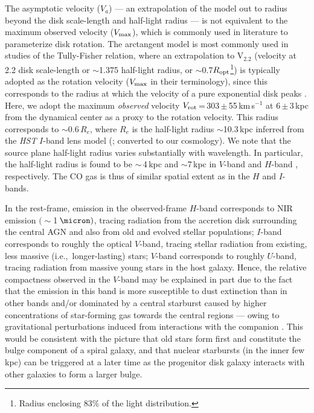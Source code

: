 \documentclass[]{emulateapj}
\newcommand{\kms}{\mbox{km\,s$^{-1}$}\xspace}
\newcommand{\eg}{{e.g.,~}}
\newcommand{\ie}{{i.e.,~}}
\begin{document}
The asymptotic velocity ($V_{a}$) --- an extrapolation of the model
out to radius beyond the disk scale-length and half-light radius ---
is not equivalent to the maximum observed velocity ($V_{\rm max}$),
which is commonly used in literature to parameterize disk rotation.
The arctangent model is most commonly used in studies of the
Tully-Fisher relation, where an extrapolation to V$_{2.2}$ (velocity
at 2.2 disk scale-length or $\sim$1.375 half-light radius,
or $\sim$0.7$R_{\rm opt}$\footnote{Radius enclosing 83\% of the light
distribution.}) is typically adopted
as the rotation velocity ($V_{\rm max}$ in their
terminology), since this corresponds to the radius at which the velocity
of a pure exponential disk peaks \citep{Courteau97b}.
Here, we adopt the maximum {\em observed} velocity
$V_{\rm rot}$\,=\,303\,$\pm$\,55\,\kms at 6\,$\pm$\,3\,kpc
from the
dynamical center as a proxy to the rotation velocity.
This radius corresponds to $\sim$0.6\,$R_e$, where $R_e$ is the half-light
radius $\sim$10.3\,kpc inferred from the {\it HST} $I$-band
lens model (; converted to
our cosmology).
We note that the source plane half-light radius varies substantially with
wavelength. In particular, the half-light radius is found to be
$\sim$\,4\,kpc and $\sim$7\,kpc in $V$-band
 and $H$-band , respectively.
The CO gas is thus of similar spatial
extent as in the $H$ and $I$-bands.

In the rest-frame,
emission in the observed-frame $H$-band corresponds to NIR emission $(\sim$1\,$\micron)$,
tracing radiation from the accretion disk surrounding
the central AGN and also from old and evolved stellar populations;
$I$-band corresponds to roughly the optical $V$-band, tracing stellar radiation from
existing, less massive (\ie longer-lasting) stars;
$V$-band corresponds to roughly $U$-band,  tracing radiation from massive young stars
in the host galaxy. Hence,
the relative compactness observed in the $V$-band may be explained in part
due to the fact that the emission in this band is
more susceptible to dust extinction than in other bands and/or dominated by
a central starburst caused by higher
concentrations of star-forming gas towards the central regions --- owing to
gravitational perturbations induced
from interactions with the companion
\citep[\eg][]{DiMatteo05a}.
This would be consistent with the picture that old stars form first and constitute the bulge component
of a spiral galaxy, and that nuclear starbursts (in the inner few kpc) can be triggered
at a later time as the progenitor disk galaxy interacts with other galaxies to form a larger bulge.
\end{document}
